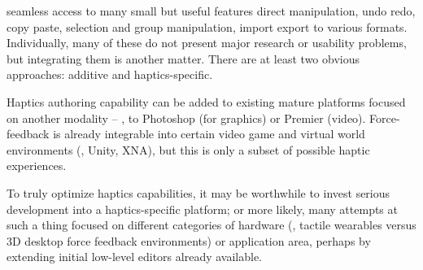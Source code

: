 %
%


%
%
 seamless access to many small but useful features
direct manipulation, undo  redo, copy  paste, selection and group manipulation,  import  export to various formats.
%
Individually, many of these do not present major research or usability problems, but integrating them is another matter.
There are at least two obvious approaches: additive and haptics-specific.

    Haptics authoring capability can be added to existing mature platforms focused on another modality -- \eg, to Photoshop (for graphics)  or Premier (video).
    Force-feedback is already integrable into certain video game and virtual world environments (\eg, Unity, XNA), but this is only a subset of possible haptic experiences.

    To truly optimize haptics capabilities, it may be worthwhile to invest serious development into a haptics-specific platform; or more likely, many attempts at such a thing focused on different categories of hardware (\eg, tactile wearables versus 3D desktop force feedback environments) or application area, perhaps by extending initial low-level editors already available.

